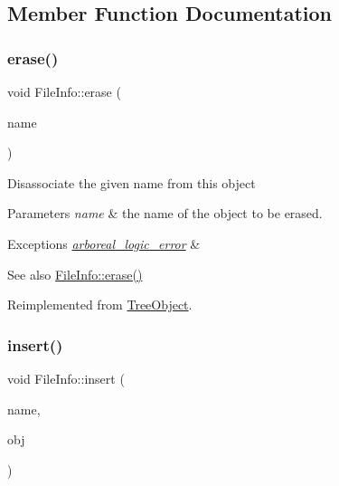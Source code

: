 \subsection{Member Function Documentation}
\mbox{\label{classFileInfo_ae058242283d3317eaf2b79428e6137f6}} 
\subsubsection{\texorpdfstring{erase()}{erase()}}
{\footnotesize\ttfamily void File\+Info\+::erase (\begin{DoxyParamCaption}\item[{string}]{name }\end{DoxyParamCaption})\hspace{0.3cm}{\ttfamily [virtual]}}

Disassociate the given name from this object 
\begin{DoxyParams}{Parameters}
{\em name} & the name of the object to be erased. \\
\hline
\end{DoxyParams}

\begin{DoxyExceptions}{Exceptions}
{\em \mbox{\hyperlink{classarboreal__logic__error}{arboreal\+\_\+logic\+\_\+error}}} & \\
\hline
\end{DoxyExceptions}
\begin{DoxySeeAlso}{See also}
\mbox{\hyperlink{classFileInfo_ae058242283d3317eaf2b79428e6137f6}{File\+Info\+::erase()}} 
\end{DoxySeeAlso}


Reimplemented from \mbox{\hyperlink{classTreeObject_a453b5df2a9ef7c6faad259900d574ee2}{Tree\+Object}}.

\mbox{\label{classFileInfo_ad93a84b63e417b07aa68b619051ab746}} 
\subsubsection{\texorpdfstring{insert()}{insert()}}
{\footnotesize\ttfamily void File\+Info\+::insert (\begin{DoxyParamCaption}\item[{string}]{name,  }\item[{\mbox{\hyperlink{classTreeObject}{Tree\+Object}} $\ast$}]{obj }\end{DoxyParamCaption})\hspace{0.3cm}{\ttfamily [virtual]}}

